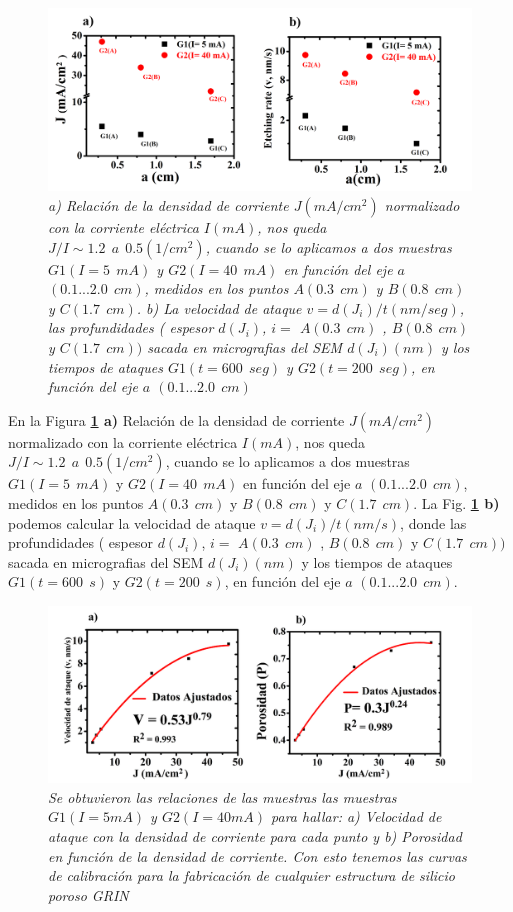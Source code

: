 \documentclass[a4paper,11pt,]{book}
\begin{document}
\begin{figure}[H]
	\centering
	\includegraphics[scale=.45]{../Images/grinJDR}
	\caption{\emph{a) Relación  de la densidad de corriente $J(mA/cm^2) $ normalizado con la corriente eléctrica $I(mA)$, nos queda $J/I \sim 1.2 \ \ a \ \ 0.5 (1/cm^2) $, cuando se lo aplicamos a dos muestras $G1(I=5 \ \ mA)$ y $G2(I=40 \ \ mA)$  en función del eje $a$ $(0.1...2.0 \ \ cm)$, medidos en los puntos  $A(0.3\ \ cm)$ y $ B(0.8 \ \  cm)$ y $ C(1.7 \ \  cm)$. b) La velocidad de ataque $v=d(J_i)/t(nm/seg)$, las profundidades ( espesor $d(J_i)$, $i=$ $A(0.3\ \ cm)$ , $ B(0.8 \ \  cm)$ y $ C(1.7 \ \  cm) )$ sacada en micrografias del SEM $d(J_i)(nm)$ y los tiempos de ataques $G1(t=600 \ \ seg)$ y $G2(t=200 \ \ seg)$, en función del eje $a$ $(0.1...2.0 \ \ cm)$  } }
	\label{fig:JDR}
\end{figure}
En la Figura \textbf{\ref{fig:JDR} a)}  Relación  de la densidad de corriente $J(mA/cm^2) $ normalizado con la corriente eléctrica $I(mA)$, nos queda $J/I \sim 1.2 \ \ a \ \ 0.5 (1/cm^2) $, cuando se lo aplicamos a dos muestras $G1(I=5 \ \ mA)$ y $G2(I=40 \ \ mA)$  en función del eje $a$ $(0.1...2.0 \ \ cm)$, medidos en los puntos  $A(0.3\ \ cm)$ y $ B(0.8 \ \  cm)$ y $ C(1.7 \ \  cm)$. 
La  Fig. \textbf{\ref{fig:JDR} b)} podemos calcular la velocidad de ataque $v=d(J_i)/t(nm/s)$, donde las profundidades ( espesor $d(J_i)$, $i=$ $A(0.3\ \ cm)$ , $ B(0.8 \ \  cm)$ y $ C(1.7 \ \  cm) )$ sacada en micrografias del SEM $d(J_i)(nm)$ y los tiempos de ataques $G1(t=600 \ \ s)$ y $G2(t=200 \ \ s)$, en función del eje $a$ $(0.1...2.0 \ \ cm)$. 
\begin{figure}[H]
	\centering
	\includegraphics[scale=.4]{../Images/grinJD31}
	\caption{\emph{ Se obtuvieron las relaciones de las muestras las muestras $G1 (I=5 mA)$ y $G2 (I=40 mA)$ para hallar: a) Velocidad de ataque con la densidad de corriente para cada punto y b) Porosidad en función de  la densidad de corriente. Con esto tenemos las curvas de calibración para la fabricación de cualquier estructura de silicio poroso GRIN    } }
	\label{fig:Indr1}
\end{figure}
\end{document}

